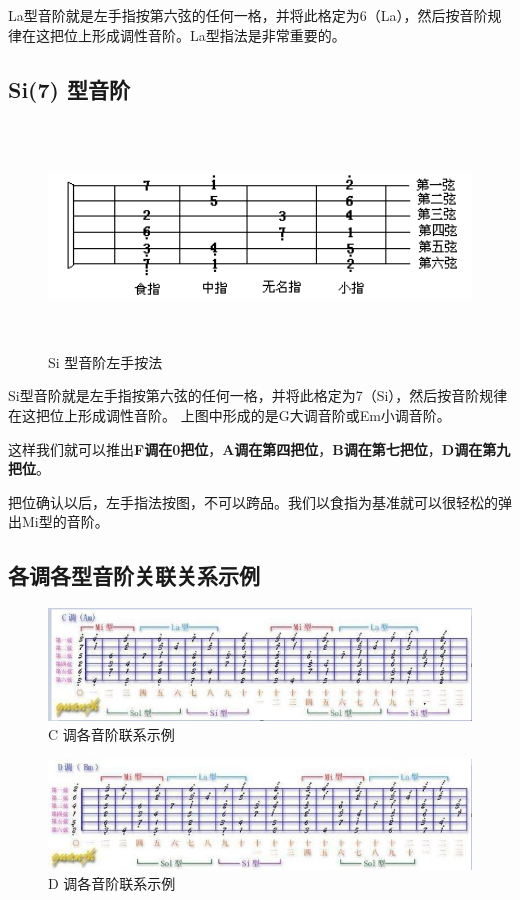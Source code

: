 \documentclass[UTF8,a4paper,12pt]{ctexbook}
\begin{document}
			La型音阶就是左手指按第六弦的任何一格，并将此格定为6（La），然后按音阶规律在这把位上形成调性音阶。La型指法是非常重要的。
		
		
		\subsection{Si(7) 型音阶}
			\begin{figure}[H]
				\centering
				\includegraphics[width=15cm,height=6cm]{si}
				\caption{Si 型音阶左手按法}
			\end{figure}	
					
			Si型音阶就是左手指按第六弦的任何一格，并将此格定为7（Si），然后按音阶规律在这把位上形成调性音阶。
			上图中形成的是G大调音阶或Em小调音阶。
			
			这样我们就可以推出\textbf{F调在0把位}，\textbf{A调在第四把位}，\textbf{B调在第七把位}，\textbf{D调在第九把位}。
			
			把位确认以后，左手指法按图，不可以跨品。我们以食指为基准就可以很轻松的弹出Mi型的音阶。	

		
		
		\newpage
		\subsection{各调各型音阶关联关系示例}
			\begin{figure}[H]
				\centering
				\includegraphics[width=17cm]{C}
				\caption{C 调各音阶联系示例}
			\end{figure}				
		
			\begin{figure}[H]
				\centering
				\includegraphics[width=17cm]{D}
				\caption{D 调各音阶联系示例}
			\end{figure}	
			
\end{document}

